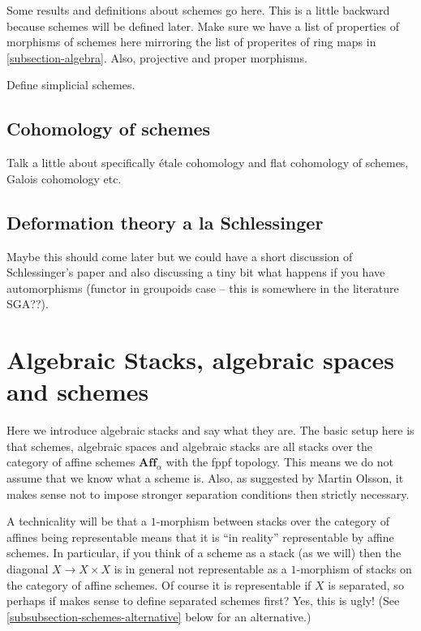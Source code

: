 \documentclass{amsart}
\theoremstyle{definition}
\theoremstyle{remark}
\numberwithin{equation}{subsection}
\begin{document}
\noindent
Some results and definitions about schemes go here. This is a little backward
because schemes will be defined later. Make sure we have a list of properties
of morphisms of schemes here mirroring the list of properites of ring maps
in \autoref{subsection-algebra}. Also, projective and proper morphisms.

\smallskip\noindent
Define simplicial schemes.

\subsection{Cohomology of schemes}
\label{subsection-schemes-cohomology}

\noindent
Talk a little about specifically \'etale cohomology and flat cohomology
of schemes, Galois cohomology etc.

\subsection{Deformation theory a la Schlessinger}
\label{subsection-deformation-schlessinger}

\noindent
Maybe this should come later but we could have a short discussion of 
Schlessinger's paper and also discussing a tiny bit what happens if 
you have automorphisms (functor in groupoids case -- this is somewhere
in the literature SGA??).

\section{Algebraic Stacks, algebraic spaces and schemes}
\label{section-algebraic-stacks}

\noindent
Here we introduce algebraic stacks and say what they are. The basic setup
here is that schemes, algebraic spaces and algebraic stacks are all
stacks over the category of affine schemes $\textbf{Aff}_\alpha$ with
the fppf topology. This means we do not assume that we know what a scheme
is. Also, as suggested by Martin Olsson, it makes sense not to impose 
stronger separation conditions then strictly necessary.

\smallskip\noindent
A technicality will be that a $1$-morphism between stacks over the category
of affines being representable means that it is ``in reality'' representable
by affine schemes. In particular, if you think of a scheme as a stack (as we
will) then the diagonal $X \to X\times X$ is in general not representable as
a $1$-morphism of stacks on the category of affine schemes. Of course it is
representable if $X$ is separated, so perhaps if makes sense to define 
separated schemes first? Yes, this is ugly! (See 
\autoref{subsubsection-schemes-alternative} below for an alternative.)
\end{document}

